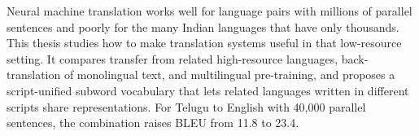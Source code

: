 Neural machine translation works well for language pairs with millions of parallel sentences
and poorly for the many Indian languages that have only thousands. This thesis studies how to
make translation systems useful in that low-resource setting. It compares transfer from related
high-resource languages, back-translation of monolingual text, and multilingual pre-training,
and proposes a script-unified subword vocabulary that lets related languages written in
different scripts share representations. For Telugu to English with 40,000 parallel sentences,
the combination raises BLEU from 11.8 to 23.4.
